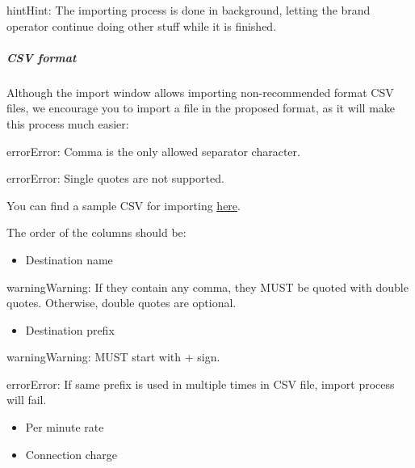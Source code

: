 \documentclass[letterpaper,10pt,english]{sphinxmanual}
\begin{document}
\begin{notice}{hint}{Hint:}
The importing process is done in background, letting the brand operator
continue doing other stuff while it is finished.
\end{notice}


\subparagraph{CSV format}
\label{administration_portal/brand/billing/destination_rates:csv-format}
Although the import window allows importing non-recommended format CSV files,
we encourage you to import a file in the proposed format, as it will make
this process much easier:

\begin{notice}{error}{Error:}
Comma is the only allowed separator character.
\end{notice}

\begin{notice}{error}{Error:}
Single quotes are not supported.
\end{notice}

You can find a sample CSV for importing \href{https://raw.githubusercontent.com/irontec/ivozprovider/main/web/portal/brand/samples/billing/pricesSample.csv}{here}.

The order of the columns should be:
\begin{itemize}
\item {} 
Destination name

\end{itemize}

\begin{notice}{warning}{Warning:}
If they contain any comma, they MUST be quoted with double quotes. Otherwise, double quotes are optional.
\end{notice}
\begin{itemize}
\item {} 
Destination prefix

\end{itemize}

\begin{notice}{warning}{Warning:}
MUST start with + sign.
\end{notice}

\begin{notice}{error}{Error:}
If same prefix is used in multiple times in CSV file, import process will fail.
\end{notice}
\begin{itemize}
\item {} 
Per minute rate

\item {} 
Connection charge

\end{itemize}
\end{document}
